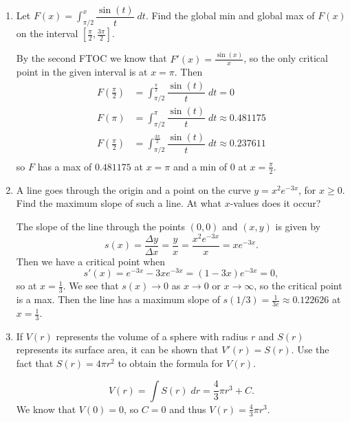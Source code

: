 \documentclass[11pt]{article}
\newcommand{\ds}{\displaystyle}
\begin{document}
\begin{enumerate}
  \newpage

\item Let $\ds F(x)=\int_{\pi/2}^x \dfrac{\sin(t)}{t}\;dt$.  Find the
  global min and global max of $F(x)$ on the interval
  $\left[\frac{\pi}{2},\frac{3\pi}{2}\right]$.

  \vfill

  By the second FTOC we know that $F'(x)=\frac{\sin(x)}{x}$, so the
  only critical point in the given interval is at $x=\pi$.  Then
  \begin{align*}
    F\left(\frac{\pi}{2}\right) &= \int_{\pi/2}^{\frac{\pi}{2}}
    \dfrac{\sin(t)}{t}\;dt = 0\\
    F\left(\pi\right) &= \int_{\pi/2}^{\pi}
    \dfrac{\sin(t)}{t}\;dt \approx 0.481175\\
    F\left(\frac{\pi}{2}\right) &= \int_{\pi/2}^{\frac{3\pi}{2}}
    \dfrac{\sin(t)}{t}\;dt \approx 0.237611\\
  \end{align*}
  so $F$ has a max of $0.481175$ at $x=\pi$ and a min of $0$ at
  $x=\frac{\pi}{2}$.

  \vfill

  \newpage

\item A line goes through the origin and a point on the curve $y=x^2
  e^{-3x}$, for $x\geq 0$.  Find the maximum slope of such a line.  At
  what $x$-values does it occur?

  \vfill

  The slope of the line through the points $(0,0)$ and $(x,y)$ is
  given by
  \[
  s(x)= \frac{\Delta y}{\Delta
    x}=\frac{y}{x}=\frac{x^2e^{-3x}}{x}=xe^{-3x}.
  \]
  Then we have a critical point when
  \[
  s'(x)=e^{-3x}-3xe^{-3x}=(1-3x)e^{-3x}=0,
  \]
  so at $x=\frac{1}{3}$.  We see that $s(x)\to 0$ as $x\to 0$ or
  $x\to\infty$, so the critical point is a max.  Then the line has a
  maximum slope of $s(1/3)=\frac{1}{3e}\approx 0.122626$ at $x=\frac{1}{3}$.
  
  \vfill
  \newpage

\item If $V(r)$ represents the volume of a sphere with radius $r$ and
  $S(r)$ represents its surface area, it can be shown that
  $V'(r)=S(r)$.  Use the fact that $S(r)=4\pi r^2$ to obtain the
  formula for $V(r)$.

  \vfill

  \[
  V(r)=\int S(r)\;dr=\frac{4}{3}\pi r^3 +C.
  \]
  We know that $V(0)=0$, so $C=0$ and thus $V(r)=\frac{4}{3}\pi r^3$.


\end{enumerate}
\end{document}
